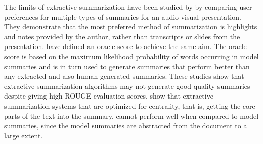 The limits of extractive summarization have been studied by  by comparing user preferences for multiple types of summaries for an audio-visual presentation. They demonstrate that the most preferred method of summarization is highlights and notes provided by the author, rather than transcripts or slides from the presentation.  have defined an oracle score to achieve the same aim. The oracle score is based on the maximum likelihood probability of words occurring in model summaries and is in turn used to generate summaries that perform better than any extracted and also human-generated summaries. These studies show that extractive summarization algorithms may not generate good quality summaries despite giving high ROUGE evaluation scores.  show that extractive summarization systems that are optimized for centrality, that is, getting the core parts of the text into the summary, cannot perform well when compared to model summaries, since the model summaries are abstracted from the document to a large extent.

